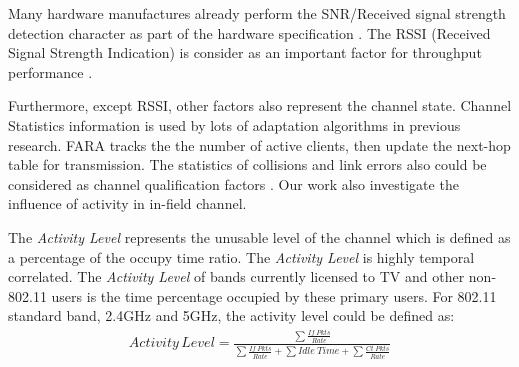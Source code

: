 
	  Many hardware manufactures already perform the SNR/Received signal strength detection character as part of the hardware specification \cite{edalat2006measured}. 
	  The RSSI (Received Signal Strength Indication) is consider as an important factor for throughput performance \cite{laneman2000energy,laneman2001efficient}. 

	  Furthermore, except RSSI, other factors also represent the channel state. Channel Statistics information is used by lots of adaptation algorithms in previous research.
	  FARA tracks the the number of active clients, then update the next-hop table for transmission\cite{rahul2009frequency}.
	  The statistics of collisions and link errors also could be considered as channel qualification factors \cite{pang2005rate}.
	  Our work also investigate the influence of activity in in-field channel.

	  The \emph{Activity Level} represents the unusable level of the channel
	  which is defined as a percentage of the occupy time ratio. 
	  The \emph{Activity Level} is highly temporal correlated.
	  The \emph{Activity Level} of bands currently licensed to TV and other non-802.11 users is the time percentage occupied by these primary users.
	  For 802.11 standard band, 2.4GHz and 5GHz, the activity level could be defined as:
	  \begin{align}
	  \label{equation:802 Activity Level}
	  Activity\,Level = \frac{\sum{\frac{If\ Pkts}{Rate}}}{\sum{\frac{If\ Pkts}{Rate}}+\sum{Idle\ Time}+\sum{\frac{Ct\ Pkts}{Rate}}}
	  \end{align}

